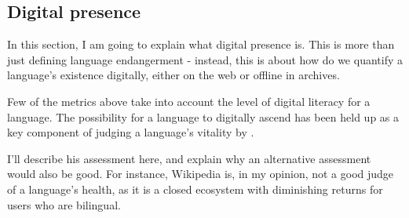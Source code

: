 




\subsection{Digital presence}



In this section, I am going to explain what digital presence is. This is more than just defining language endangerment - instead, this is about how do we quantify a language's existence digitally, either on the web or offline in archives.

Few of the metrics above take into account the level of digital literacy for a language. The possibility for a language to digitally ascend has been held up as a key component of judging a language's vitality by \citet{kornai2013digital}. %


I'll describe his assessment here, and explain why an alternative assessment would also be good. For instance, Wikipedia is, in my opinion, not a good judge of a language's health, as it is a closed ecosystem with diminishing returns for users who are bilingual.



